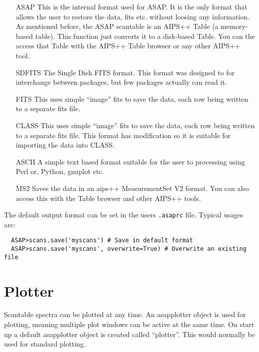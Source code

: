 \documentclass[11pt]{article}
\begin{document}
\begin{itemize}
\item[ASAP] This is the internal format used for ASAP. It is the only
  format that allows the user to restore the data, fits etc. without
  loosing any information.  As mentioned before, the ASAP scantable is
  an AIPS++ Table (a memory-based table).  This function just converts
  it to a disk-based Table.  You can the access that Table with the
  AIPS++ Table browser or any other AIPS++ tool.

\item[SDFITS] The Single Dish FITS format. This format was designed to
  for interchange between packages, but few packages actually can read
  it.

\item[FITS] This uses simple ``image'' fits to save the data, each row
  being written to a separate fits file.

\item[CLASS] This uses simple ``image'' fits to save the data, each row
  being written to a separate fits file. This format has modification so it 
  is suitable for importing the data into CLASS.

\item[ASCII] A simple text based format suitable for the user to
processing using Perl or, Python, gnuplot etc.

\item[MS2] Saves the data in an aips++ MeasurementSet V2 format.
You can also access this with the Table browser and other AIPS++
tools.

\end{itemize}

The default output format can be set in the users {\tt .asaprc} file.
Typical usages are:

\begin{verbatim}
  ASAP>scans.save('myscans') # Save in default format
  ASAP>scans.save('myscans', overwrite=True) # Overwrite an existing file
\end{verbatim}

\section{Plotter}

Scantable spectra can be plotted at any time. An
asapplotter object is used for plotting, meaning multiple plot windows
can be active at the same time. On start up a default asapplotter
object is created called ``plotter''. This would normally be used for
standard plotting.
\end{document}
